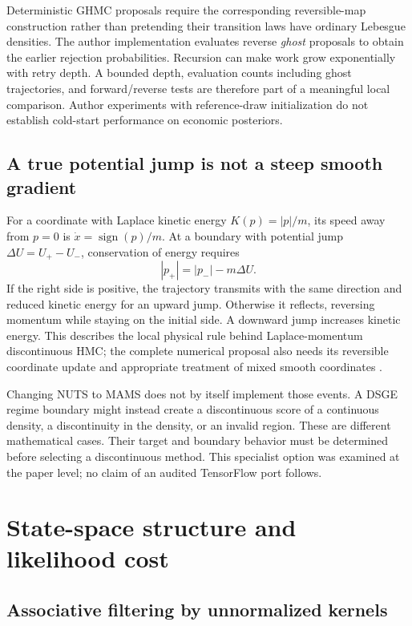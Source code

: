 Deterministic GHMC proposals require the corresponding reversible-map
construction rather than pretending their transition laws have ordinary
Lebesgue densities. The author implementation evaluates reverse
\emph{ghost} proposals to obtain the earlier rejection probabilities.
Recursion can make work grow exponentially with retry depth. A bounded depth,
evaluation counts including ghost trajectories, and forward/reverse tests
are therefore part of a meaningful local comparison. Author experiments with
reference-draw initialization do not establish cold-start performance on
economic posteriors.

\subsection{A true potential jump is not a steep smooth gradient}

For a coordinate with Laplace kinetic energy $K(p)=|p|/m$, its speed away
from $p=0$ is $\dot x=\operatorname{sign}(p)/m$. At a boundary with potential
jump $\Delta U=U_+-U_-$, conservation of energy requires
\begin{equation}
 |p_+|=|p_-|-m\Delta U.
 \label{eq:bf-modern-jump-energy}
\end{equation}
If the right side is positive, the trajectory transmits with the same
direction and reduced kinetic energy for an upward jump. Otherwise it
reflects, reversing momentum while staying on the initial side. A downward
jump increases kinetic energy. This describes the local physical rule behind
Laplace-momentum discontinuous HMC; the complete numerical proposal also needs
its reversible coordinate update and appropriate treatment of mixed smooth
coordinates \citep{nishimura2020discontinuous}.

Changing NUTS to MAMS does not by itself implement those events. A DSGE regime
boundary might instead create a discontinuous score of a continuous density,
a discontinuity in the density, or an invalid region. These are different
mathematical cases. Their target and boundary behavior must be determined
before selecting a discontinuous method. This specialist option was examined
at the paper level; no claim of an audited TensorFlow port follows.

\section{State-space structure and likelihood cost}
\label{sec:bf-modern-state-space}

\subsection{Associative filtering by unnormalized kernels}

